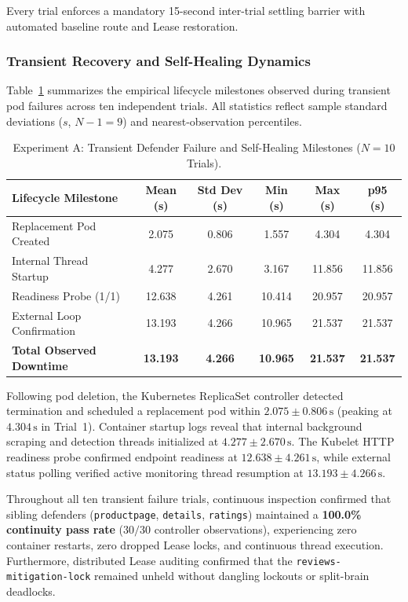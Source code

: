 Every trial enforces a mandatory 15-second inter-trial settling barrier with automated baseline route and Lease restoration.

\subsubsection{Transient Recovery and Self-Healing Dynamics}
Table~\ref{tab:scenario3_recovery_lifecycle} summarizes the empirical lifecycle milestones observed during transient pod failures across ten independent trials. All statistics reflect sample standard deviations ($s$, $N-1=9$) and nearest-observation percentiles.

\begin{table}[!t]
\renewcommand{\arraystretch}{1.2}
\caption{Experiment A: Transient Defender Failure and Self-Healing Milestones ($N=10$ Trials).}
\label{tab:scenario3_recovery_lifecycle}
\centering
\footnotesize
\setlength{\tabcolsep}{4.0pt}
\begin{tabular}{@{}l c c c c c@{}}
\toprule
\textbf{Lifecycle Milestone} & \textbf{Mean (s)} & \textbf{Std Dev (s)} & \textbf{Min (s)} & \textbf{Max (s)} & \textbf{p95 (s)} \\
\midrule
Replacement Pod Created     & 2.075 & 0.806 & 1.557 & 4.304 & 4.304 \\
Internal Thread Startup     & 4.277 & 2.670 & 3.167 & 11.856 & 11.856 \\
Readiness Probe (1/1)       & 12.638 & 4.261 & 10.414 & 20.957 & 20.957 \\
External Loop Confirmation  & 13.193 & 4.266 & 10.965 & 21.537 & 21.537 \\
\midrule
\textbf{Total Observed Downtime} & \textbf{13.193} & \textbf{4.266} & \textbf{10.965} & \textbf{21.537} & \textbf{21.537} \\
\bottomrule
\end{tabular}
\end{table}

Following pod deletion, the Kubernetes ReplicaSet controller detected termination and scheduled a replacement pod within $2.075 \pm 0.806\,\text{s}$ (peaking at $4.304\,\text{s}$ in Trial~1). Container startup logs reveal that internal background scraping and detection threads initialized at $4.277 \pm 2.670\,\text{s}$. The Kubelet HTTP readiness probe confirmed endpoint readiness at $12.638 \pm 4.261\,\text{s}$, while external status polling verified active monitoring thread resumption at $13.193 \pm 4.266\,\text{s}$.

Throughout all ten transient failure trials, continuous inspection confirmed that sibling defenders (\texttt{productpage}, \texttt{details}, \texttt{ratings}) maintained a \textbf{100.0\% continuity pass rate} ($30/30$ controller observations), experiencing zero container restarts, zero dropped Lease locks, and continuous thread execution. Furthermore, distributed Lease auditing confirmed that the \texttt{reviews-mitigation-lock} remained unheld without dangling lockouts or split-brain deadlocks.

